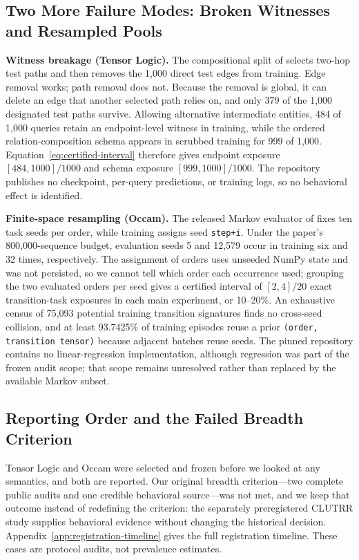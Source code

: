 \documentclass[twoside,11pt]{article}
\begin{document}
\subsection{Two More Failure Modes: Broken Witnesses and Resampled Pools}
\label{sec:tl-occam}

\textbf{Witness breakage (Tensor Logic).}  The compositional split of
\citet{shah2026tensorlogic} selects two-hop test paths and then removes the
1,000 direct test edges from training.  Edge removal works; path removal
does not.  Because the removal is global, it can delete an edge that another
selected path relies on, and only 379 of the 1,000 designated test paths
survive.  Allowing alternative intermediate entities, 484 of 1,000 queries
retain an endpoint-level witness in training, while the ordered
relation-composition schema appears in scrubbed training for 999 of 1,000.
Equation~\ref{eq:certified-interval} therefore gives endpoint exposure
$[484,1000]/1000$ and schema exposure $[999,1000]/1000$.  The repository
publishes no checkpoint, per-query predictions, or training logs, so no
behavioral effect is identified.

\textbf{Finite-space resampling (Occam).}  The released Markov evaluator of
\citet{deora2025occam} fixes ten task seeds per order, while training
assigns seed \texttt{step+i}.  Under the paper's 800,000-sequence budget,
evaluation seeds 5 and 12,579 occur in training six and 32 times,
respectively.  The assignment of orders uses unseeded NumPy state and was
not persisted, so we cannot tell which order each occurrence used; grouping
the two evaluated orders per seed gives a certified interval of $[2,4]/20$
exact transition-task exposures in each main experiment, or 10--20\%.  An
exhaustive census of 75,093 potential training transition signatures finds
no cross-seed collision, and at least 93.7425\% of training episodes reuse a
prior \texttt{(order, transition tensor)} because adjacent batches reuse
seeds.  The pinned repository contains no linear-regression implementation,
although regression was part of the frozen audit scope; that scope remains
unresolved rather than replaced by the available Markov subset.

\subsection{Reporting Order and the Failed Breadth Criterion}

Tensor Logic and Occam were selected and frozen before we looked at any
semantics, and both are reported.  Our original breadth criterion---two
complete public audits and one credible behavioral source---was not met, and
we keep that outcome instead of redefining the criterion: the separately
preregistered CLUTRR study supplies behavioral evidence without changing
the historical decision.  Appendix~\ref{app:registration-timeline} gives
the full registration timeline.  These cases are protocol audits, not
prevalence estimates.
\end{document}

